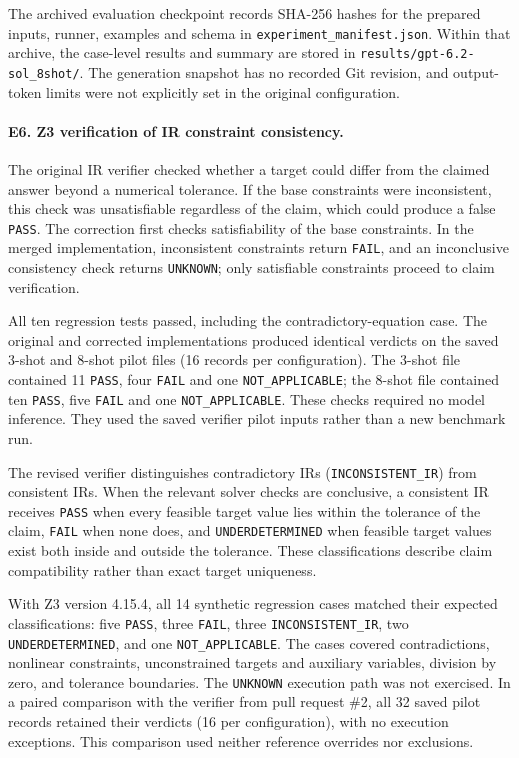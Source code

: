 The archived evaluation checkpoint records SHA-256 hashes for the prepared inputs, runner, examples and schema in \texttt{experiment\_manifest.json}. Within that archive, the case-level results and summary are stored in \texttt{results/\allowbreak gpt-6.2-sol\_8shot/\allowbreak }. The generation snapshot has no recorded Git revision, and output-token limits were not explicitly set in the original configuration.

\paragraph{E6. Z3 verification of IR constraint consistency.}
The original IR verifier checked whether a target could differ from the claimed answer beyond a numerical tolerance. If the base constraints were inconsistent, this check was unsatisfiable regardless of the claim, which could produce a false \texttt{PASS}. The correction first checks satisfiability of the base constraints. In the merged implementation, inconsistent constraints return \texttt{FAIL}, and an inconclusive consistency check returns \texttt{UNKNOWN}; only satisfiable constraints proceed to claim verification.

All ten regression tests passed, including the contradictory-equation case. The original and corrected implementations produced identical verdicts on the saved 3-shot and 8-shot pilot files (16 records per configuration). The 3-shot file contained 11 \texttt{PASS}, four \texttt{FAIL} and one \texttt{NOT\_APPLICABLE}; the 8-shot file contained ten \texttt{PASS}, five \texttt{FAIL} and one \texttt{NOT\_APPLICABLE}. These checks required no model inference. They used the saved verifier pilot inputs rather than a new benchmark run.

The revised verifier distinguishes contradictory IRs (\texttt{INCONSISTENT\_IR}) from consistent IRs. When the relevant solver checks are conclusive, a consistent IR receives \texttt{PASS} when every feasible target value lies within the tolerance of the claim, \texttt{FAIL} when none does, and \texttt{UNDERDETERMINED} when feasible target values exist both inside and outside the tolerance. These classifications describe claim compatibility rather than exact target uniqueness.

With Z3 version 4.15.4, all 14 synthetic regression cases matched their expected classifications: five \texttt{PASS}, three \texttt{FAIL}, three \texttt{INCONSISTENT\_IR}, two \texttt{UNDERDETERMINED}, and one \texttt{NOT\_APPLICABLE}. The cases covered contradictions, nonlinear constraints, unconstrained targets and auxiliary variables, division by zero, and tolerance boundaries. The \texttt{UNKNOWN} execution path was not exercised. In a paired comparison with the verifier from pull request \#2, all 32 saved pilot records retained their verdicts (16 per configuration), with no execution exceptions. This comparison used neither reference overrides nor exclusions.

